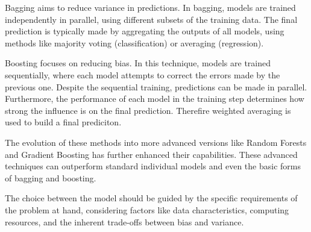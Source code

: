 Bagging aims to reduce variance in predictions. In bagging, models are trained 
independently in parallel, using different subsets of the training data.
The final prediction is typically made by aggregating the outputs of all models,
using methods like majority voting (classification) or averaging (regression).


Boosting focuses on reducing bias. In this technique, models are trained sequentially,
where each model attempts to correct the errors made by the previous one. Despite 
the sequential training, predictions can be made in parallel. Furthermore, the
performance of each model in the training step determines how strong the influence
is on the final prediction. Therefire weighted averaging is used to build a final
prediciton.


The evolution of these methods into more advanced versions like Random Forests
and Gradient Boosting has further enhanced their capabilities. These advanced 
techniques can outperform standard individual models and even the basic forms 
of bagging and boosting. 


The choice between the model should be guided by the specific requirements of 
the problem at hand, considering factors like data characteristics, computing 
resources, and the inherent trade-offs between bias and variance.
